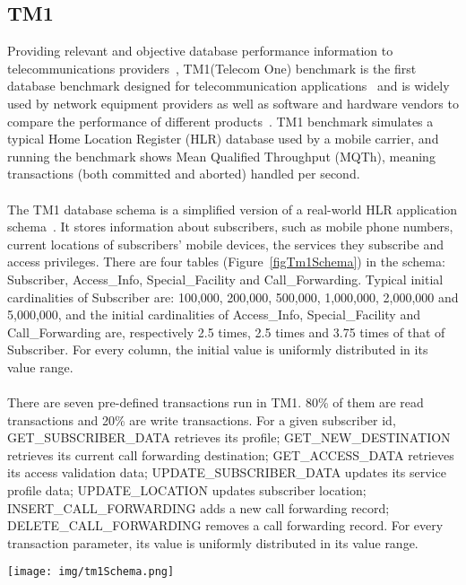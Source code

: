 \documentclass[a4paper,10pt]{article}
\begin{document}
\subsection{TM1}
Providing relevant and objective database performance information to telecommunications providers~\cite{tm1Merlin}, TM1(Telecom One) benchmark is the first database benchmark designed for telecommunication applications~\cite{tm1Sun} and is widely used by network equipment providers as well as software and hardware vendors to compare the performance of different products~\cite{tm1Amd}. TM1 benchmark simulates a typical Home Location Register (HLR) database used by a mobile carrier, and running the benchmark shows Mean Qualified Throughput (MQTh), meaning transactions (both committed and aborted) handled per second.
\\\\
The TM1 database schema is a simplified version of a real-world HLR application schema~\cite{tm1Sun}. It stores information about subscribers, such as mobile phone numbers, current locations of subscribers' mobile devices, the services they subscribe and access privileges. There are four tables (Figure~\ref{figTm1Schema}) in the schema: Subscriber, Access\_Info, Special\_Facility and Call\_Forwarding. Typical initial cardinalities of Subscriber are: 100,000, 200,000, 500,000, 1,000,000, 2,000,000 and 5,000,000, and the initial cardinalities of Access\_Info, Special\_Facility and Call\_Forwarding are, respectively 2.5 times, 2.5 times and 3.75 times of that of Subscriber. For every column, the initial value is uniformly distributed in its value range. 
\\\\
There are seven pre-defined transactions run in TM1. 80\% of them are read transactions and 20\% are write transactions. For a given subscriber id, GET\_SUBSCRIBER\_DATA retrieves its profile; GET\_NEW\_DESTINATION retrieves its current call forwarding destination; GET\_ACCESS\_DATA retrieves its access validation data; UPDATE\_SUBSCRIBER\_DATA updates its service profile data; UPDATE\_LOCATION updates subscriber location; INSERT\_CALL\_FORWARDING adds a new call forwarding record; DELETE\_CALL\_FORWARDING removes a call forwarding record. For every transaction parameter, its value is uniformly distributed in its value range. 
\begin{figure*}
\centering
\begin{minipage}[t]{3.0in}
    \centering
    \texttt{[image: img/tm1Schema.png]}
    \caption{TM1 database schema~\cite{tm1Solids}}
    \label{figTm1Schema}
\end{minipage}
\end{figure*}
\end{document}
